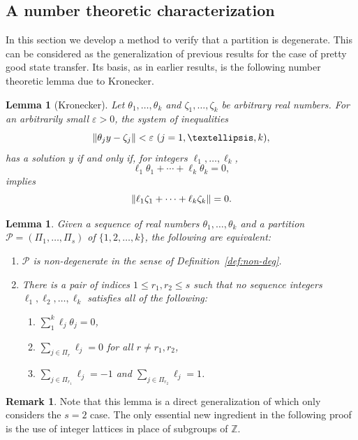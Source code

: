 \documentclass[11pt]{article}
\newtheorem{lemma}[theo]{Lemma}
\theoremstyle{definition}
\newtheorem{rema}[theo]{Remark}
\numberwithin{equation}{section}
\newcommand\+{\mkern2mu}
\newcommand{\Z}{\mathbb{Z}}
\newcommand{\ep}{\varepsilon}
\newcommand{\1}{\mathbf 1}
\DeclarePairedDelimiter{\znorm}{\lVert}{\rVert}
\begin{document}
\subsection{A number theoretic characterization}

In this section we develop a method to verify that a partition is degenerate. This can be considered as the generalization of previous results for the case of pretty good state transfer. Its basis, as in earlier results, is the following number theoretic lemma due to Kronecker.

\begin{lemma}[Kronecker]\label{lem:Kron}
Let $\theta_1,\ldots,\theta_k$ and $\zeta_1,\ldots,\zeta_k$ be arbitrary real numbers.  For an arbitrarily small $\ep > 0$, the system of inequalities
\[
\znorm{\theta_ j y - \zeta_j} < \ep \ (j=1,\ldots,k),
\]
has a solution $y$ if and only if, for integers $\ell_1,\ldots,\ell_k$, 
\[
\ell_1\theta_1+\cdots+\ell_k\theta_k = 0,
\]
implies
\[
\znorm{\ell_1\zeta_1 + \cdots + \ell_k\zeta_k}= 0.
\]
\end{lemma}


\begin{lemma}\label{thm:kronecker}
Given a sequence of real numbers $\theta_1, \dots, \theta_k$ and a partition $\mathcal{P} = (\Pi_1,\dots,\Pi_s)$ of $\{1,2,\dots, k\}$, the following are equivalent:
\begin{enumerate}[label=\roman*)]
\item $\mathcal{P}$ is non-degenerate in the sense of Definition~\ref{def:non-deg}.
\item There is a pair of indices $1 \leq r_1, r_2 \leq s$ such that no sequence integers $\ell_1, \ell_2, \dots, \ell_k$ satisfies all of the following:
\begin{enumerate}[label=\alph*)]
\item $\sum_1^k \ell_j \theta_j = 0$,
\item $\sum_{j\in\Pi_r}\ell_j=0$ for all $r \neq r_1,r_2$,
\item $\sum_{j\in\Pi_{r_1}}\ell_j=-1$ and  $\sum_{j\in\Pi_{r_2}}\ell_j=1$.
\end{enumerate}

\end{enumerate}
\end{lemma}

\begin{rema}
Note that this lemma is a direct generalization of \cite[Theorem 2.4]{chan2020approximate} which only considers the $s=2$ case. The only essential new ingredient in the following proof is the use of integer lattices in place of subgroups of $\Z$.
\end{rema}
\end{document}
